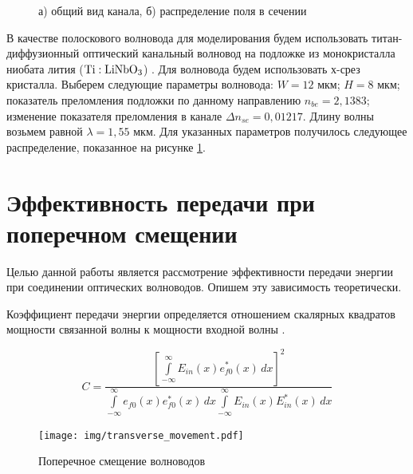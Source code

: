 \begin{figure}[h!]
	\begin{minipage}[h]{0.49\linewidth}
	\end{minipage}
	\hfill
	\begin{minipage}[h]{0.49\linewidth}
	\end{minipage}
	\caption{а) общий вид канала, б) распределение поля в сечении}
	\label{polozok}
\end{figure}

В качестве полоскового волновода для моделирования будем использовать титан-диффузионный оптический канальный волновод на подложке из монокристалла ниобата лития ($\rm Ti:LiNbO_3$) \cite{vlada}. Для волновода будем использовать х-срез кристалла. Выберем  следующие параметры волновода: $W=12$ мкм; $H=8$ мкм; показатель преломления подложки по данному направлению $n_{be}=2,1383$; изменение показателя преломления в канале $\Delta n_{se}=0,01217$. Длину волны возьмем равной $\lambda = 1,55$ мкм. Для указанных параметров получилось следующее распределение, показанное на рисунке \ref{polozok}.

\section{Эффективность передачи при поперечном смещении}

Целью данной работы является рассмотрение эффективности передачи энергии при соединении оптических волноводов. Опишем эту зависимость теоретически.

Коэффициент передачи энергии определяется отношением скалярных квадратов мощности связанной волны к мощности входной волны \cite{lefevre}.

\begin{equation}
	\label{coupling_full}
	C = \frac{\left[\int\limits_{-\infty}^{\infty}E_{in}(x)e_{f0}^*(x) \,dx\right]^2}
	{\int\limits_{-\infty}^{\infty}e_{f0}(x)e_{f0}^*(x) \,dx
	 \int\limits_{-\infty}^{\infty}E_{in}(x)E_{in}^*(x) \,dx}
\end{equation}

\begin{figure}[h!]
	\texttt{[image: img/transverse\_movement.pdf]}
	\caption{Поперечное смещение волноводов}
	\label{transverse_movement}
\end{figure}

